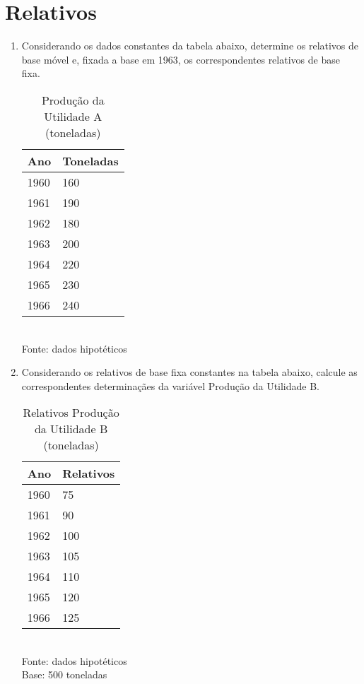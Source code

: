\chapter{Relativos}

\begin{enumerate}[resume]

\item Considerando os dados constantes da tabela abaixo, determine os relativos de base móvel e, fixada a base em 1963, os correspondentes relativos de base fixa.
	\begin{table}[!htb]
	\centering
	\caption{Produção da Utilidade A (toneladas)}
	\begin{tabular}{ll}
	Ano & Toneladas \\
	\hline 
	1960 & 160  \\
	1961 & 190  \\
	1962 & 180  \\
	1963 & 200  \\
	1964 & 220  \\
	1965 & 230  \\
	1966 & 240  \\
	\end{tabular} 
	\\ Fonte: dados hipotéticos
	\end{table}

\item Considerando os relativos de base fixa constantes na tabela abaixo, calcule as correspondentes determinaçães da variável Produção da Utilidade B.
	\begin{table}[!htb]
	\centering
	\caption{Relativos Produção da Utilidade B (toneladas)}
	\begin{tabular}{ll}
	Ano & Relativos \\
	\hline 
	1960 & 75  \\
	1961 & 90  \\
	1962 & 100  \\
	1963 & 105  \\
	1964 & 110  \\
	1965 & 120  \\
	1966 & 125  \\
	\end{tabular} 
	\\ Fonte: dados hipotéticos \\
	Base: 500 toneladas	
	\end{table}
	

\end{enumerate}
